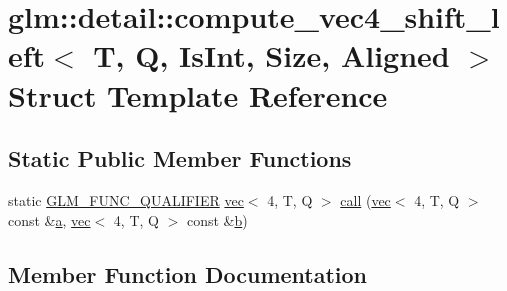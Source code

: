 \hypertarget{structglm_1_1detail_1_1compute__vec4__shift__left}{}\section{glm\+:\+:detail\+:\+:compute\+\_\+vec4\+\_\+shift\+\_\+left$<$ T, Q, Is\+Int, Size, Aligned $>$ Struct Template Reference}
\label{structglm_1_1detail_1_1compute__vec4__shift__left}
\subsection*{Static Public Member Functions}
\begin{DoxyCompactItemize}
\item 
static \mbox{\hyperlink{setup_8hpp_a33fdea6f91c5f834105f7415e2a64407}{G\+L\+M\+\_\+\+F\+U\+N\+C\+\_\+\+Q\+U\+A\+L\+I\+F\+I\+ER}} \mbox{\hyperlink{structglm_1_1vec}{vec}}$<$ 4, T, Q $>$ \mbox{\hyperlink{structglm_1_1detail_1_1compute__vec4__shift__left_a2a88686231e04bbb8855908e3655a2dc}{call}} (\mbox{\hyperlink{structglm_1_1vec}{vec}}$<$ 4, T, Q $>$ const \&\mbox{\hyperlink{_s_d_l__opengl__glext_8h_a3309789fc188587d666cda5ece79cf82}{a}}, \mbox{\hyperlink{structglm_1_1vec}{vec}}$<$ 4, T, Q $>$ const \&\mbox{\hyperlink{_s_d_l__opengl__glext_8h_a0f71581a41fd2264c8944126dabbd010}{b}})
\end{DoxyCompactItemize}


\subsection{Member Function Documentation}
\mbox{\label{structglm_1_1detail_1_1compute__vec4__shift__left_a2a88686231e04bbb8855908e3655a2dc}} 
